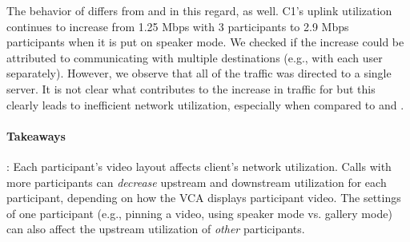 The behavior of \teams differs from \meet and \zoom in this regard, as well.
C1's uplink utilization continues to increase from 1.25 Mbps with 3
participants to 2.9 Mbps participants when it is put on speaker mode. We
checked if the increase could be attributed to \teams communicating with
multiple destinations (e.g., with each user separately). However, we observe
that all of the traffic was directed to a single server. It is not clear what
contributes to the increase in traffic for \teams but this clearly leads to
inefficient network utilization, especially when compared to \zoom and \meet. 
\vspace{7pt}
\begin{mdframed}[roundcorner=5pt, backgroundcolor=black!10]
    \paragraph{Takeaways}: Each participant's video layout affects client's
    network utilization. Calls with more participants can {\em decrease} upstream and downstream utilization 
    for each participant, depending on how the VCA displays participant video.
    The settings of one participant (e.g., pinning a video, using speaker mode
    vs. gallery mode) can also affect the upstream utilization of {\em other}
    participants.
\end{mdframed}

